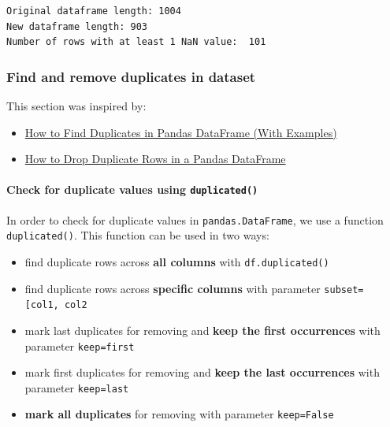 \documentclass [oneside,10pt,a4paper,ngerman,BCOR10mm,headsepline,parindent,final]{scrartcl}
\providecommand{\tightlist}{%
      \setlength{\itemsep}{0pt}\setlength{\parskip}{0pt}}
\begin{document}
    \begin{Verbatim}[commandchars=\\\{\}]
Original dataframe length: 1004
New dataframe length: 903
Number of rows with at least 1 NaN value:  101
    \end{Verbatim}

    \hypertarget{find-and-remove-duplicates-in-dataset}{%
\subsubsection{Find and remove duplicates in
dataset}\label{find-and-remove-duplicates-in-dataset}}

This section was inspired by:

\begin{itemize}
\tightlist
\item
  \href{https://www.statology.org/pandas-find-duplicates/}{How to Find
  Duplicates in Pandas DataFrame (With Examples)}
\item
  \href{https://www.statology.org/pandas-drop-duplicates/}{How to Drop
  Duplicate Rows in a Pandas DataFrame}
\end{itemize}

    \hypertarget{check-for-duplicate-values-using-duplicated}{%
\paragraph{\texorpdfstring{Check for duplicate values using
\texttt{duplicated()}}{Check for duplicate values using duplicated()}}\label{check-for-duplicate-values-using-duplicated}}

In order to check for duplicate values in \texttt{pandas.DataFrame}, we
use a function \texttt{duplicated()}. This function can be used in two
ways:

\begin{itemize}
\tightlist
\item
  find duplicate rows across \textbf{all columns} with
  \texttt{df.duplicated()}
\item
  find duplicate rows across \textbf{specific columns} with parameter
  \texttt{subset={[}\textquotesingle{}col1\textquotesingle{},\ \textquotesingle{}col2\textquotesingle{}{]}}
\item
  mark last duplicates for removing and \textbf{keep the first
  occurrences} with parameter
  \texttt{keep=\textquotesingle{}first\textquotesingle{}}
\item
  mark first duplicates for removing and \textbf{keep the last
  occurrences} with parameter
  \texttt{keep=\textquotesingle{}last\textquotesingle{}}
\item
  \textbf{mark all duplicates} for removing with parameter
  \texttt{keep=False}
\end{itemize}
\end{document}
